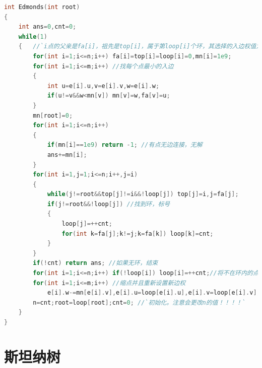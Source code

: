 \documentclass[a4paper]{book}
\begin{document}
\begin{lstlisting}[language=c++,escapeinside=``]
int Edmonds(int root)
{
    int ans=0,cnt=0;
    while(1)
    {	//`i点的父亲是fa[i]，祖先是top[i]，属于第loop[i]个环，其选择的入边权值为mn[i]`
        for(int i=1;i<=n;i++) fa[i]=top[i]=loop[i]=0,mn[i]=1e9;
        for(int i=1;i<=m;i++) //找每个点最小的入边
        {
            int u=e[i].u,v=e[i].v,w=e[i].w;
            if(u!=v&&w<mn[v]) mn[v]=w,fa[v]=u;
        }
        mn[root]=0;
        for(int i=1;i<=n;i++) 
        {
            if(mn[i]==1e9) return -1; //有点无边连接，无解
            ans+=mn[i];
        }
        for(int i=1,j=1;i<=n;i++,j=i)
        {
            while(j!=root&&top[j]!=i&&!loop[j]) top[j]=i,j=fa[j];
            if(j!=root&&!loop[j]) //找到环，标号
            {
                loop[j]=++cnt;
                for(int k=fa[j];k!=j;k=fa[k]) loop[k]=cnt;
            }
        }
        if(!cnt) return ans; //如果无环，结束
        for(int i=1;i<=n;i++) if(!loop[i]) loop[i]=++cnt;//将不在环内的点设置为独立环
        for(int i=1;i<=m;i++) //缩点并且重新设置新边权
            e[i].w-=mn[e[i].v],e[i].u=loop[e[i].u],e[i].v=loop[e[i].v];
        n=cnt;root=loop[root];cnt=0; //`初始化。注意会更改n的值！！！！`
    }
}
\end{lstlisting}
\section{斯坦纳树}
\end{document}
